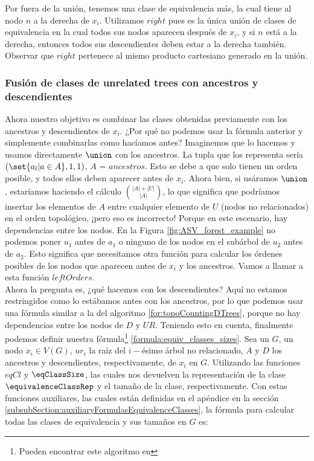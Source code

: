 Por fuera de la unión, tenemos una clase de equivalencia más, la cual tiene al nodo $n$ a la derecha de $x_i$. Utilizamos $right$ pues es la única unión de clases de equivalencia en la cual todos sus nodos aparecen después de $x_i$, y si $n$ está a la derecha, entonces todos sus descendientes deben estar a la derecha también. Observar que $right$ pertenece al mismo producto cartesiano generado en la unión. 


\subsubsection{Fusión de clases de unrelated trees con ancestros y descendientes}

Ahora nuestro objetivo es combinar las clases obtenidas previamente con los ancestros y descendientes de $x_i$. ¿Por qué no podemos usar la fórmula anterior y simplemente combinarlas como hacíamos antes? Imaginemos que lo hacemos y usamos directamente $\union$ con los ancestros. La tupla que los representa sería  $(\set{ a_l | a \in A}, 1, 1)$, $A$ = $ancestros$. Esto se debe a que solo tienen un orden posible, y todos ellos deben aparecer antes de $x_i$. Ahora bien, si usáramos $\union$, estaríamos haciendo el cálculo $\binom{|A| + |U|}{|A|}$, lo que significa que podríamos insertar los elementos de $A$ entre cualquier elemento de $U$ (nodos no relacionados) en el orden topológico, ¡pero eso es incorrecto! Porque en este escenario, hay dependencias entre los nodos. En la Figura \ref{fig:ASV_forest_example} no podemos poner $u_1$ antes de $a_1$ o ninguno de los nodos en el subárbol de $u_2$ antes de $a_2$. Esto significa que necesitamos otra función para calcular los órdenes posibles de los nodos que aparecen antes de $x_i$ y los ancestros. Vamos a llamar a esta función $leftOrders$. \\

Ahora la pregunta es, ¿qué hacemos con los descendientes? Aquí no estamos restringidos como lo estábamos antes con los ancestros, por lo que podemos usar una fórmula similar a la del algoritmo \ref{for:topoCountingDTrees}, porque no hay dependencias entre los nodos de $D$ y $UR$. Teniendo esto en cuenta, finalmente podemos definir nuestra fórmula\footnote{Pueden encontrar este algoritmo en } \ref{formula:equiv_classes_sizes}. Sea un \dtree{} $G$, un nodo $x_i \in V(G)$, $ur_i$ la raíz del $i-$ésimo árbol no relacionado, $A$ y $D$ los ancestros y descendientes, respectivamente, de $x_i$ en $G$. Utilizando las funciones $eqCl$ y $\eqClassSize$, las cuales nos devuelven la representación de la clase $\equivalenceClassRep$ y el tamaño de la clase, respectivamente. Con estas funciones auxiliares, las cuales están definidas en el apéndice en la sección \ref{subsubSection:auxiliaryFormulasEquivalenceClasses}, la fórmula para calcular todas las clases de equivalencia y sus tamaños en $G$ es:

